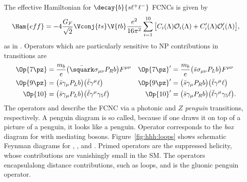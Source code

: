 The effective Hamiltonian for $\decay{b}{s\ell^+\ell^-}$ FCNCs is given by
\begin{equation}
  \Ham{eff} = -4\frac{G_F}{\sqrt{2}}\Vconj{ts}\V{tb}\frac{e^2}{16\pi^2}
  \sum_{i=1}^{10}\big[C_i(\Lambda)\mathcal{O}_i(\Lambda)
    +C_i^\prime(\Lambda)\mathcal{O}_i^\prime(\Lambda)\big],
\end{equation}
as in . %
Operators which are particularly sensitive to NP contributions in  transitions are
\begin{align}
  \Op{7\pz} &= \frac{m_b}{e}\big(\bar\squark\sigma_{\mu\nu}P_Rb\big)F^{\mu\nu}
  &\Op{7\pz}^\prime &= \frac{m_b}{e}\big(\bar s \sigma_{\mu\nu}P_Lb\big)F^{\mu\nu}
  \nonumber\\
  \Op{9\pz} &= \big(\bar s\gamma_\mu P_Lb\big)\big(\bar\ell\gamma^\mu\ell\big)
  &\Op{9\pz}^\prime &= \big(\bar s\gamma_\mu P_Rb\big)\big(\bar\ell\gamma^\mu\ell\big)
  \nonumber\\
  \Op{10} &= \big(\bar s\gamma_\mu P_Lb\big)\big(\bar\ell\gamma^\mu\gamma_5\ell\big)
  &\Op{10}^\prime &= \big(\bar s\gamma_\mu P_Rb\big)\big(\bar\ell\gamma^\mu\gamma_5\ell\big).
\end{align}
The operators  and  describe the FCNC via a photonic and $Z$ \emph{penguin} transitions,
respectively.
A penguin diagram is so called, because if one draws it on top of a picture of a penguin, it looks
like a penguin.
Operator  corresponds to the \emph{box} diagram for with mediating \Wp bosons.
Figure~\ref{fig:hhh:loops} shows schematic Feynman diagrams for , , and .
Primed operators are the suppressed helicity, whose contributions are vanishingly small in the SM.
The operators  encapsulalong distance contributions, such as \ccbar
loops, and  is the gluonic penguin operator.


